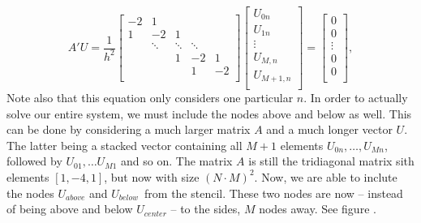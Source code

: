 \begin{equation*}
    A'U = \frac{1}{h^2}
    \begin{bmatrix}
    -2& 1 \\
    1 & -2 & 1 &   \\
      & \ddots & \ddots & \ddots & \\
      &   & 1 & -2 & 1 \\
      &   &  & 1 & -2 \\
    \end{bmatrix}
    \begin{bmatrix}
    U_{0n} \\ U_{1n} \\ \vdots \\ U_{M,n} \\ U_{M+1,n} \\
    \end{bmatrix}
    =
    \begin{bmatrix}
    0 \\ 0 \\ \vdots \\ 0 \\ 0 \\
    \end{bmatrix}
    ,
    \label{ex3:eq:simple_matrix}
\end{equation*}
Note also that this equation only considers one particular $n$.
In order to actually solve our entire system, we must include the nodes above and below as well.
This can be done by considering a much larger matrix $A$ and a much longer vector $U$.
The latter being a stacked vector containing all $M+1$ elements $U_{0n}, \ldots, U_{Mn}$, followed by $U_{01}, \ldots U_{M1}$ and so on.
The matrix $A$ is still the tridiagonal matrix sith elements $[1, -4, 1]$, but now with size $(N\cdot M)^2$.
Now, we are able to inclute the nodes $U_{above}$ and $U_{below}$ from the stencil.
These two nodes are now -- instead of being above and below $U_{center}$ -- to the sides, $M$ nodes away. See figure %
.

